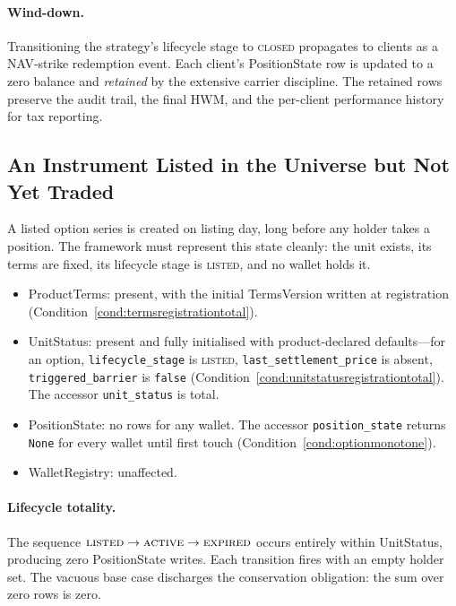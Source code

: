 \documentclass[11pt,a4paper]{article}
\begin{document}
\paragraph{Wind-down.} Transitioning the strategy's lifecycle stage to \textsc{closed} propagates to clients as a NAV-strike redemption event. Each client's PositionState row is updated to a zero balance and \emph{retained} by the extensive carrier discipline. The retained rows preserve the audit trail, the final HWM, and the per-client performance history for tax reporting.

\subsection{An Instrument Listed in the Universe but Not Yet Traded}
\label{sec:untraded}

A listed option series is created on listing day, long before any holder takes a position. The framework must represent this state cleanly: the unit exists, its terms are fixed, its lifecycle stage is \textsc{listed}, and no wallet holds it.

\begin{itemize}[leftmargin=*]
\item ProductTerms: present, with the initial TermsVersion written at registration (Condition~\ref{cond:termsregistrationtotal}).
\item UnitStatus: present and fully initialised with product-declared defaults---for an option, \texttt{lifecycle\_stage} is \textsc{listed}, \texttt{last\_settlement\_price} is absent, \texttt{triggered\_barrier} is \texttt{false} (Condition~\ref{cond:unitstatusregistrationtotal}). The accessor \texttt{unit\_status} is total.
\item PositionState: no rows for any wallet. The accessor \texttt{position\_state} returns \texttt{None} for every wallet until first touch (Condition~\ref{cond:optionmonotone}).
\item WalletRegistry: unaffected.
\end{itemize}

\paragraph{Lifecycle totality.} The sequence $\textsc{listed} \to \textsc{active} \to \textsc{expired}$ occurs entirely within UnitStatus, producing zero PositionState writes. Each transition fires with an empty holder set. The vacuous base case discharges the conservation obligation: the sum over zero rows is zero.
\end{document}
